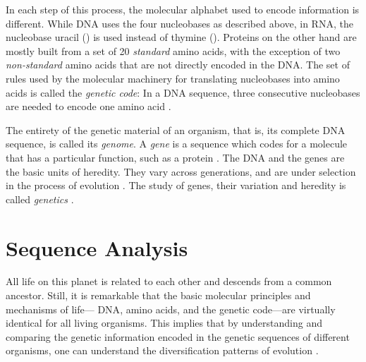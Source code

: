 In each step of this process, the molecular alphabet used to encode information is different.
While \ac{DNA} uses the four nucleobases as described above,
in RNA, the nucleobase uracil () is used instead of thymine ().
Proteins on the other hand are mostly built from a set of \num{20} \emph{standard} amino acids,
with the exception of two \emph{non-standard} amino acids that are not directly encoded in the \ac{DNA}.
The set of rules used by the molecular machinery for translating nucleobases into amino acids
is called the \emph{genetic code}:
In a \ac{DNA} sequence, three consecutive nucleobases are needed to encode one amino acid \cite{Shu2017}.

The entirety of the genetic material of an organism, that is, its complete \ac{DNA} sequence, is called its \emph{genome}.
A \emph{gene} is a sequence which codes for a molecule that has a particular function, such as a protein \cite{Gericke2007}.
The \ac{DNA} and the genes are the basic units of heredity.
They vary across generations, and are under selection in the process of evolution \cite{Dawkins1989}.
The study of genes, their variation and heredity is called \emph{genetics} \cite{Griffiths2000}.


\section{Sequence Analysis}
\label{ch:Foundations:sec:SequenceAnalysis}

All life on this planet is related to each other and descends from a common ancestor.
Still, it is remarkable that the basic molecular principles and mechanisms of life---%
\ac{DNA}, amino acids, and the genetic code---are virtually identical for all living organisms.
This implies that by understanding and comparing the genetic information
encoded in the genetic sequences of different organisms,
one can understand the diversification patterns of evolution \cite{Zuckerkandl1965}.



